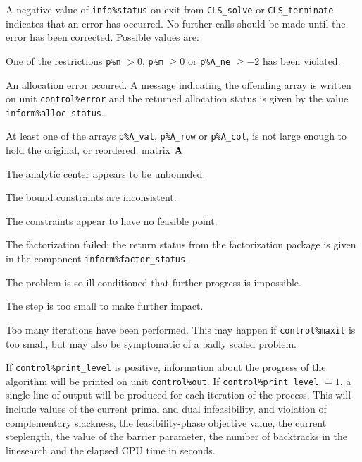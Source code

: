 \documentclass{galahad}
\newcommand{\packagename}{CLS}
\begin{document}

\galerrors
A negative value of {\tt info\%status} on exit from
{\tt \packagename\_solve}
or
{\tt \packagename\_terminate}
indicates that an error has occurred. No further calls should be made
until the error has been corrected. Possible values are:

\begin{description}

 One of the restrictions {\tt p\%n} $> 0$, {\tt p\%m} $\geq  0$ or
    {\tt p\%A\_ne} $\geq -2$ has been violated.

 An allocation error occured. A message indicating the offending
 array is written on unit {\tt control\%error} and the returned allocation
 status is given by the value {\tt inform\%alloc\_status}.

 At least one of the arrays
 {\tt p\%A\_val}, {\tt p\%A\_row} or {\tt p\%A\_col},
 is not large enough to hold the original, or reordered, matrix ${\mathbf{A}}$

 The analytic center appears to be unbounded.

 The bound constraints are inconsistent.

 The constraints appear to have no feasible point.

 The factorization failed; the return status from the factorization
    package is given in the component {\tt inform\%fac\-t\-or\_status}.

 The problem is so ill-conditioned that further progress is impossible.

 The step is too small to make further impact.

 Too many iterations have been performed. This may happen if
    {\tt control\%maxit} is too small, but may also be symptomatic of
    a badly scaled problem.

\end{description}


\galinfo
If {\tt control\%print\_level} is positive, information about the progress
of the algorithm will be printed on unit {\tt control\-\%out}.
If {\tt control\%print\_level} $= 1$, a single line of output will be produced
for each iteration of the process.
This will include values of the current primal and dual infeasibility, and
violation of complementary slackness, the feasibility-phase objective value,
the current steplength, the value of the barrier parameter, the
number of backtracks in the linesearch and the elapsed CPU time in seconds.
\end{document}
